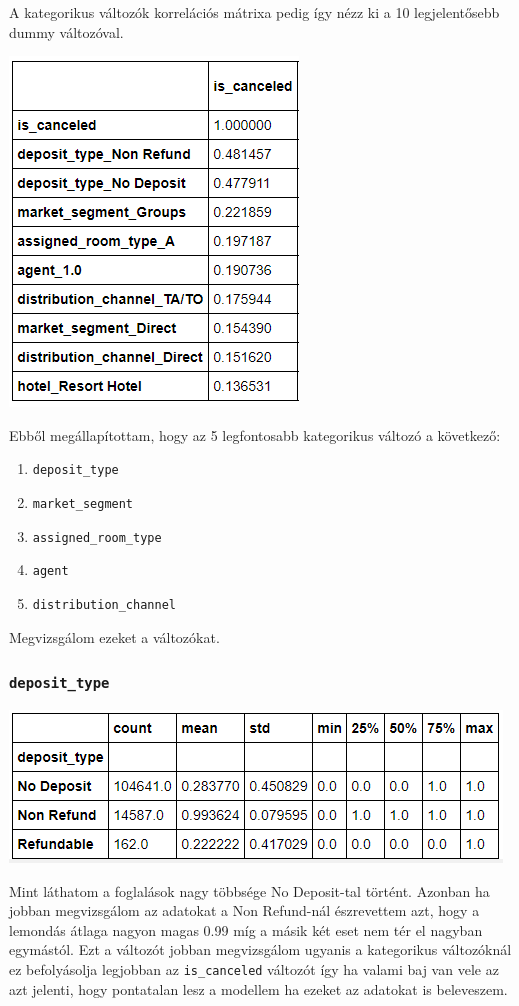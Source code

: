 A kategorikus változók korrelációs mátrixa pedig így nézz ki a 10 legjelentősebb dummy változóval.

\includegraphics{images/4.fejezet/4.korrelacios1.PNG}

Ebből megállapítottam, hogy az 5 legfontosabb kategorikus változó a következő:
\begin{enumerate}
    \item \texttt{deposit\_type}
    \item \texttt{market\_segment}
    \item \texttt{assigned\_room\_type}
    \item \texttt{agent}
    \item \texttt{distribution\_channel}
\end{enumerate}

Megvizsgálom ezeket a változókat.
\subsubsection{\texttt{deposit\_type}}
\includegraphics{images/4.fejezet/4.korrelacios2.PNG}

Mint láthatom a foglalások nagy többsége No Deposit-tal történt. Azonban ha jobban megvizsgálom az adatokat a Non Refund-nál észrevettem azt, hogy a lemondás átlaga nagyon magas 0.99 míg a másik két eset nem tér el nagyban egymástól. Ezt a változót jobban megvizsgálom ugyanis a kategorikus változóknál ez befolyásolja legjobban az \texttt{is\_canceled} változót így ha valami baj van vele az azt jelenti, hogy pontatalan lesz a modellem ha ezeket az adatokat is beleveszem.

